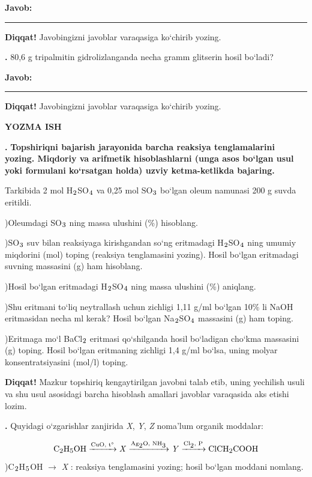 \documentclass[11pt,a4paper]{article}
\renewcommand{\textsubscript}[1]{\ensuremath{_{\text{\fontsize{8}{8}\selectfont #1}}}}
\newcommand{\qn}[1]{\textbf{\fontsize{11.5}{13}\selectfont #1}}
\newcommand{\qsep}{\par\vspace{1pt}\noindent\rule{0pt}{0.4pt}\par\vspace{5pt}}
\newcommand{\diqqat}[1]{\par\smallskip\noindent\textbf{Diqqat!} #1\par\medskip}
\newcommand{\javob}{\par\smallskip\noindent\textbf{Javob:} \rule[-2pt]{7.5cm}{0.4pt}\par\smallskip\noindent\textbf{Diqqat!} Javobingizni javoblar varaqasiga ko`chirib yozing.\par\medskip}
\begin{document}
\javob\qsep
\noindent\qn{40.} 80,6 g tripalmitin gidrolizlanganda necha gramm glitserin hosil bo`ladi?
\javob\qsep
\par\bigskip\begin{center}\textbf{\fontsize{13}{15}\selectfont YOZMA ISH}\end{center}
\noindent\qn{41.} \textbf{Topshiriqni bajarish jarayonida barcha reaksiya tenglamalarini yozing. Miqdoriy va arifmetik hisoblashlarni (unga asos bo`lgan usul yoki formulani ko`rsatgan holda) uzviy ketma-ketlikda bajaring.}\par\smallskip
Tarkibida 2 mol H\textsubscript{2}SO\textsubscript{4} va 0,25 mol SO\textsubscript{3} bo`lgan oleum namunasi 200 g suvda eritildi.\par
{})Oleumdagi SO\textsubscript{3} ning massa ulushini (\%) hisoblang.\par
{})SO\textsubscript{3} suv bilan reaksiyaga kirishgandan so`ng eritmadagi H\textsubscript{2}SO\textsubscript{4} ning umumiy miqdorini (mol) toping (reaksiya tenglamasini yozing). Hosil bo`lgan eritmadagi suvning massasini (g) ham hisoblang.\par
{})Hosil bo`lgan eritmadagi H\textsubscript{2}SO\textsubscript{4} ning massa ulushini (\%) aniqlang.\par
{})Shu eritmani to`liq neytrallash uchun zichligi 1,11 g/ml bo`lgan 10\% li NaOH eritmasidan necha ml kerak? Hosil bo`lgan Na\textsubscript{2}SO\textsubscript{4} massasini (g) ham toping.\par
{})Eritmaga mo`l BaCl\textsubscript{2} eritmasi qo`shilganda hosil bo`ladigan cho`kma massasini (g) toping. Hosil bo`lgan eritmaning zichligi 1,4 g/ml bo`lsa, uning molyar konsentratsiyasini (mol/l) toping.\par
\diqqat{Mazkur topshiriq kengaytirilgan javobni talab etib, uning yechilish usuli va shu usul asosidagi barcha hisoblash amallari javoblar varaqasida aks etishi lozim.}\qsep
\noindent\qn{42.} Quyidagi o`zgarishlar zanjirida \textit{X}, \textit{Y}, \textit{Z} noma'lum organik moddalar:\par
\[\setlength{\fboxsep}{0pt}\text{C\textsubscript{2}H\textsubscript{5}OH}\xrightarrow{\text{CuO, t\textdegree{}}}\text{\textit{X}}\xrightarrow{\text{Ag\textsubscript{2}O, NH\textsubscript{3}}}\text{\textit{Y}}\xrightarrow{\text{Cl\textsubscript{2}, P}}\text{ClCH\textsubscript{2}COOH}\]
)C\textsubscript{2}H\textsubscript{5}OH $\to$ \textit{X} : reaksiya tenglamasini yozing; hosil bo`lgan moddani nomlang.\par
\end{document}
